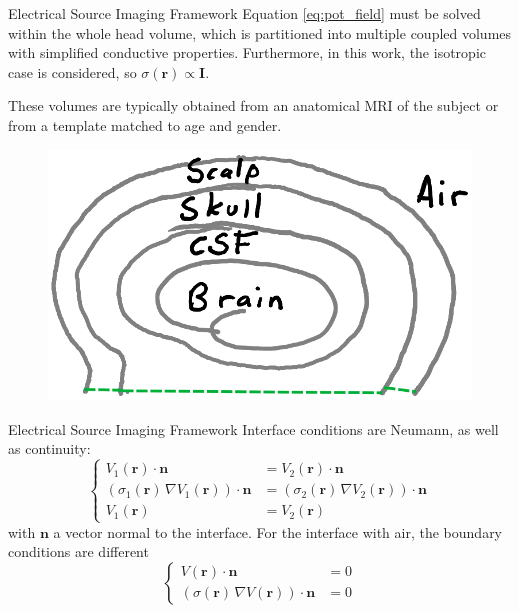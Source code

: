 \documentclass[progressbar=head]{beamer}
\newcommand{\ppar}[1]{ \left( #1 \right) }
\newcommand{\id}{\mathbf{I}}
\newcommand{\rr}{\mathbf{r}}
\begin{document}
\begin{frame}{Electrical Source Imaging Framework}
Equation \eqref{eq:pot_field} must be solved within the whole head volume, which is partitioned into multiple coupled volumes with simplified conductive properties.
Furthermore, in this work, the isotropic case is considered, so 
$\sigma(\rr) \propto \id$.

These volumes are typically obtained from an anatomical MRI of the subject or from a template matched to age and gender.

\begin{figure}
\centering
\includegraphics[width=0.4\linewidth]{./img_oldbeamer/sketch06}
\end{figure}
\end{frame}

\begin{frame}{Electrical Source Imaging Framework}
Interface conditions are Neumann, as well as continuity:
\begin{equation}
\left\{
\begin{array}{rl}
    V_1(\rr) \cdot \mathbf{n} &= V_2(\rr) \cdot \mathbf{n} \\
    \ppar{\sigma_1(\rr)\, \nabla V_1(\rr)}\cdot \mathbf{n} &= 
    \ppar{\sigma_2(\rr)\, \nabla V_2(\rr)}\cdot \mathbf{n} \\
    V_1(\rr) &= V_2(\rr)
\end{array}
\right.
\end{equation}
with $\mathbf{n}$ a vector normal to the interface.
For the interface with air, the boundary conditions are different
\begin{equation}
\left\{
\begin{array}{rl}
    V(\rr) \cdot \mathbf{n} &= 0 \\
    \ppar{\sigma(\rr)\, \nabla V(\rr)}\cdot \mathbf{n} &= 0
\end{array}
\right.
\end{equation}    
\end{frame}
\end{document}
